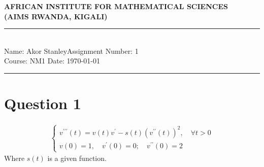 \documentclass[12pt,a4paper]{article}
\newcommand{\student}{Akor Stanley}
\newcommand{\course}{NM1 }
\newcommand{\assignment}{1}
\begin{document}
\thispagestyle{empty}
\begin{center}
\textbf{AFRICAN INSTITUTE FOR MATHEMATICAL SCIENCES \\[0.5cm]
(AIMS RWANDA, KIGALI)}
\vspace{1.0cm}
\end{center}
\noindent
\rule{17cm}{0.2cm}\\[0.3cm]
Name: \student \hfill Assignment Number: \assignment\\[0.1cm]
Course: \course \hfill Date: \today\\
\rule{17cm}{0.05cm}
\vspace{1.0cm}
\section*{Question 1}
\begin{align*}
\begin{cases}
v^{\prime \prime \prime}(t)=v(t)v^{\prime}-s(t)(v^{\prime \prime}(t))^{2}, \quad \forall t>0\\
v(0)=1, \quad v^{\prime}(0)=0; \quad v^{\prime \prime}(0)=2
\end{cases}
\end{align*}
Where $s(t)$ is a given function.
\end{document}
